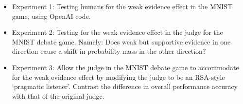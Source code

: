 \documentclass{article}
\begin{document}
\begin{itemize}
	\item Experiment 1: Testing humans for the weak evidence effect in the MNIST game, using OpenAI code.

	\item Experiment 2: Testing for the weak evidence effect in the judge for the MNIST debate game. Namely: Does weak but supportive evidence in one direction cause a shift in probability mass in the other direction?
	
	\item Experiment 3: Allow the judge in the MNIST debate game to accommodate for the weak evidence effect by modifying the judge to be an RSA-style `pragmatic listener'. Contrast the difference in overall performance accuracy with that of the original judge.

\end{itemize}

\printbibliography
\end{document}
